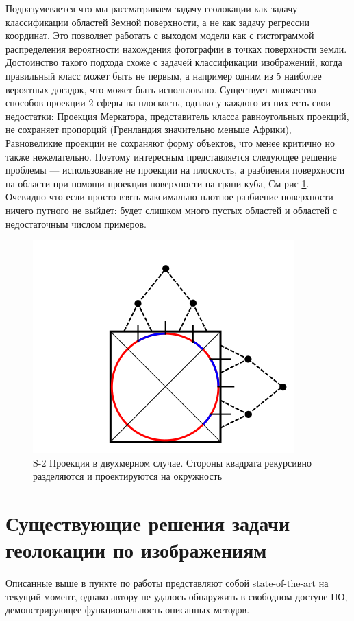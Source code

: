 Подразумевается что мы рассматриваем задачу геолокации как задачу классификации областей Земной поверхности, а не как задачу регрессии координат. Это позволяет работать с выходом модели как с гистограммой распределения вероятности нахождения фотографии в точках поверхности земли.
Достоинство такого подхода схоже с задачей классификации изображений, когда правильный класс может быть не первым, а например одним из 5 наиболее вероятных догадок, что может быть использовано.
Существует множество способов проекции $2$-сферы на плоскость, однако у каждого из них есть свои недостатки:
Проекция Меркатора, представитель класса равноугольных проекций, не сохраняет пропорций (Гренландия значительно меньше Африки), Равновеликие проекции не сохраняют форму объектов, что менее критично но также нежелательно.
Поэтому интересным представляется следующее решение проблемы --- использование не проекции  на плоскость, а разбиения поверхности на области при помощи проекции поверхности на грани куба, См рис \ref{pic:projection}. Очевидно что если просто взять максимально плотное разбиение поверхности ничего путного не выйдет: будет слишком много пустых областей и областей с недостаточным числом примеров.
\begin{figure}
	\centering
	\includegraphics{img/projection}
	\caption{S-2 Проекция в двухмерном случае. Стороны квадрата рекурсивно разделяются и проектируются на окружность}
	\label{pic:projection}
\end{figure}

\section{Существующие решения задачи геолокации по изображениям}

Описанные выше в пункте по работы \cite{weyand2016planet} представляют собой state-of-the-art на текущий момент, однако автору не удалось обнаружить в свободном доступе ПО, демонстрирующее функциональность описанных методов. 


